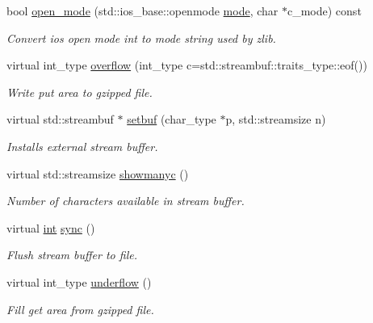 \begin{DoxyCompactItemize}
\item 
bool \hyperlink{classgzfilebuf_ab0c2c304183e591706681af26add3da2}{open\+\_\+mode} (std\+::ios\+\_\+base\+::openmode \hyperlink{ioapi_8h_ab77191763734fbb3e515371393ccb606}{mode}, char $\ast$c\+\_\+mode) const
\begin{DoxyCompactList}\small\item\em Convert ios open mode int to mode string used by zlib. \end{DoxyCompactList}\item 
virtual int\+\_\+type \hyperlink{classgzfilebuf_aa5c16941b7897bba35349199cbbac2ed}{overflow} (int\+\_\+type c=std\+::streambuf\+::traits\+\_\+type\+::eof())
\begin{DoxyCompactList}\small\item\em Write put area to gzipped file. \end{DoxyCompactList}\item 
virtual std\+::streambuf $\ast$ \hyperlink{classgzfilebuf_a11ff58ab8f4de52cf496892b3a97827e}{setbuf} (char\+\_\+type $\ast$p, std\+::streamsize n)
\begin{DoxyCompactList}\small\item\em Installs external stream buffer. \end{DoxyCompactList}\item 
virtual std\+::streamsize \hyperlink{classgzfilebuf_aa6c80a4f96fdc5e4a991113699428164}{showmanyc} ()
\begin{DoxyCompactList}\small\item\em Number of characters available in stream buffer. \end{DoxyCompactList}\item 
virtual \hyperlink{lp__lib_8h_adeb9ec6400320e4923ac9d836d509ddb}{int} \hyperlink{classgzfilebuf_a8fdf6b079487c0034cb920c63c9eaf55}{sync} ()
\begin{DoxyCompactList}\small\item\em Flush stream buffer to file. \end{DoxyCompactList}\item 
virtual int\+\_\+type \hyperlink{classgzfilebuf_a23768f9935022e54608c53173f0047c0}{underflow} ()
\begin{DoxyCompactList}\small\item\em Fill get area from gzipped file. \end{DoxyCompactList}\end{DoxyCompactItemize}



